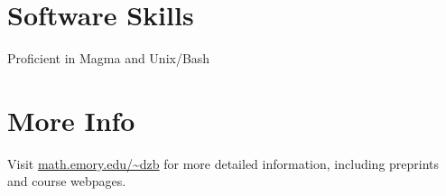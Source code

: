 \documentclass[margin,line]{res}
\newenvironment{list1}{
  \begin{list}{\ding{113}}{%
      \setlength{\itemsep}{0in}
      \setlength{\parsep}{0in} \setlength{\parskip}{0in}
      \setlength{\topsep}{0in} \setlength{\partopsep}{0in}
      \setlength{\leftmargin}{0.17in}}}{\end{list}}
\begin{document}
\begin{resume}
\section{\sc Software Skills}
Proficient in Magma and Unix/Bash

\section{\sc More Info}
Visit \url{math.emory.edu/\~dzb} for more detailed information, including preprints and course webpages.








\end{resume}
\end{document}

